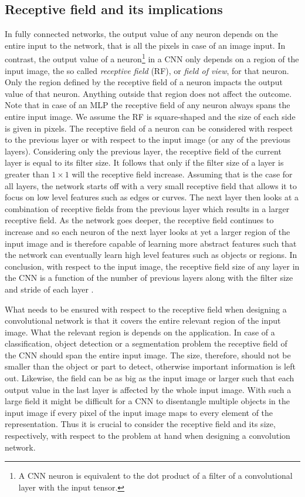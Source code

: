 \documentclass[a4paper,12pt]{report}
\begin{document}
\subsection{Receptive field and its implications}\label{sec:rf}
In fully connected networks, the output value of any neuron depends on the entire input to the network, that is all the pixels in case of an image input. In contrast, the output value of a neuron\footnote{A CNN neuron is equivalent to the dot product of a filter of a convolutional layer with the input tensor.} in a CNN only depends on a region of the input image, the so called \textit{receptive field} (RF), or \textit{field of view}, for that neuron. Only the region defined by the receptive field of a neuron impacts the output value of that neuron. Anything outside that region does not affect the outcome. Note that in case of an MLP the receptive field of any neuron always spans the entire input image. We assume the RF is square-shaped and the size of each side is given in pixels. The receptive field of a neuron can be considered with respect to the previous layer or with respect to the input image (or any of the previous layers). Considering only the previous layer, the receptive field of the current layer is equal to its filter size. It follows that only if the filter size of a layer is greater than $1 \times 1$ will the receptive field increase. Assuming that is the case for all layers, the network starts off with a very small receptive field that allows it to focus on low level features such as edges or curves. The next layer then looks at a combination of receptive fields from the previous layer which results in a larger receptive field. As the network goes deeper, the receptive field continues to increase and so each neuron of the next layer looks at yet a larger region of the input image and is therefore capable of learning more abstract features such that the network can eventually learn high level features such as objects or regions. In conclusion, with respect to the input image, the receptive field size of any layer in the CNN is a function of the number of previous layers along with the filter size and stride of each layer \cite{li_recept_field_2017}.

What needs to be ensured with respect to the receptive field when designing a convolutional network is that it covers the entire relevant region of the input image. What the relevant region is depends on the application. In case of a classification, object detection or a segmentation problem the receptive field of the CNN should span the entire input image. The size, therefore, should not be smaller than the object or part to detect, otherwise important information is left out. Likewise, the field can be as big as the input image or larger such that each output value in the last layer is affected by the whole input image. With such a large field it might be difficult for a CNN to disentangle multiple objects in the input image if every pixel of the input image maps to every element of the representation. Thus it is crucial to consider the receptive field and its size, respectively, with respect to the problem at hand when designing a convolution network.
\end{document}
